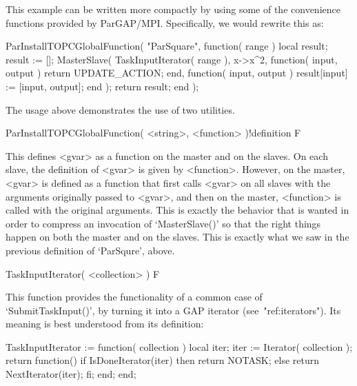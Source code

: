 
This example can be written more compactly by using some of the
convenience functions provided by ParGAP/MPI.  Specifically, we would
rewrite this as:


\beginexample
ParInstallTOPCGlobalFunction( "ParSquare", function( range )
  local result;
  result := [];
  MasterSlave( TaskInputIterator( range ),
               x->x^2,
               function( input, output ) return UPDATE_ACTION; end, 
               function( input, output ) result[input] := [input, output]; end
             );
  return result;
end );
\endexample

The usage above demonstrates the use of two utilities.

\>ParInstallTOPCGlobalFunction( <string>, <function> )!{definition} F

This defines <gvar> as a function on the master and on the slaves.
On each slave, the definition of <gvar> is given by <function>.
However, on the master, <gvar> is defined as a function that first
calls <gvar> on all slaves with the arguments originally passed
to <gvar>, and then on the master, <function> is called with the
original arguments.  This is exactly the behavior that is wanted
in order to compress an invocation of `MasterSlave()' so that the
right things happen on both the master and on the slaves.  This
is exactly what we saw in the previous definition of `ParSqure',
above.

\>TaskInputIterator( <collection> ) F

This function provides the functionality of a common case of
`SubmitTaskInput()', by turning it into a GAP iterator
(see~"ref:iterators").  Its meaning is best understood from its
definition:

\begintt
TaskInputIterator := function( collection )
  local iter;
  iter := Iterator( collection );
  return function()
           if IsDoneIterator(iter) then return NOTASK;
           else return NextIterator(iter);
           fi;
         end;
end;
\endtt


